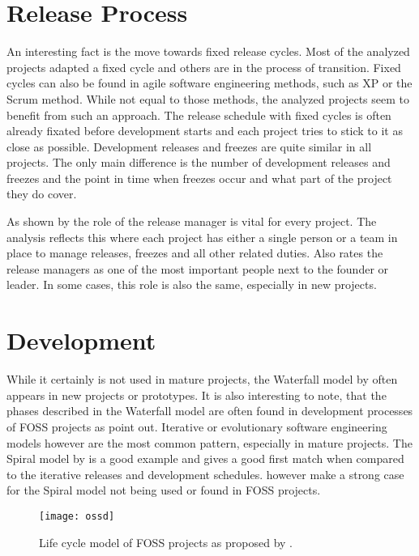 
\section{Release Process} %

An interesting fact is the move towards fixed release cycles. Most of the
analyzed projects adapted a fixed cycle and others are in the process of
transition. Fixed cycles can also be found in agile software engineering
methods, such as \acl{XP} or the Scrum method. While not equal to those
methods, the analyzed projects seem to benefit from such an approach. The
release schedule with fixed cycles is often already fixated before development
starts and each project tries to stick to it as close as possible. Development
releases and freezes are quite similar in all projects. The only main
difference is the number of development releases and freezes and the point in
time when freezes occur and what part of the project they do cover.

As shown by \textcite{Mockus2002} the role of the release manager is vital for
every project. The analysis reflects this where each project has either a
single person or a team in place to manage releases, freezes and all other
related duties. Also \textcite{Crowston2005} rates the release managers as one
of the most important people next to the founder or leader. In some cases, this
role is also the same, especially in new projects.


\section{Development} %

While it certainly is not used in mature projects, the Waterfall model by
\textcite{Royce1970} often appears in new projects or prototypes. It is also
interesting to note, that the phases described in the Waterfall model are often
found in development processes of \ac{FOSS} projects as \textcite{Roets2007}
point out. Iterative or evolutionary software engineering models however are
the most common pattern, especially in mature projects. The Spiral model by
\textcite{Boehm1988} is a good example and gives a good first match when
compared to the iterative releases and development schedules.
\textcite{Roets2007} however make a strong case for the Spiral model not being
used or found in \ac{FOSS} projects.

\begin{figure}[htbp]
  \centering
  \texttt{[image: ossd]}
  \caption[Life Cycle Model of \acl{FOSS} Projects]
  {Life cycle model of \acl{FOSS} projects as proposed by \textcite{Roets2007}.}
\end{figure}

